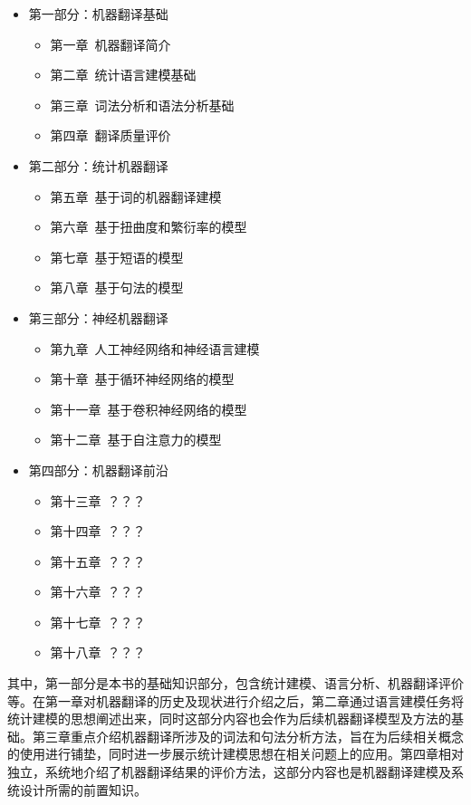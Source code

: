 \begin{spacing}{1.18}
\begin{itemize}
\vspace{0.5em}
\item 第一部分：机器翻译基础
    \begin{itemize}
    \item 第一章\ 机器翻译简介
    \item 第二章\ 统计语言建模基础
    \item 第三章\ 词法分析和语法分析基础
    \item 第四章\ 翻译质量评价
    \end{itemize}
\vspace{0.5em}
\item 第二部分：统计机器翻译
    \begin{itemize}
    \item 第五章\ 基于词的机器翻译建模
    \item 第六章\ 基于扭曲度和繁衍率的模型
    \item 第七章\ 基于短语的模型
    \item 第八章\ 基于句法的模型
    \end{itemize}
\vspace{0.5em}
\item 第三部分：神经机器翻译
    \begin{itemize}
    \item 第九章\ 人工神经网络和神经语言建模
    \item 第十章\ 基于循环神经网络的模型
    \item 第十一章\ 基于卷积神经网络的模型
    \item 第十二章\ 基于自注意力的模型
    \end{itemize}
\vspace{0.5em}
\item 第四部分：机器翻译前沿
    \begin{itemize}
    \item 第十三章\ ？？？
    \item 第十四章\ ？？？
    \item 第十五章\ ？？？
    \item 第十六章\ ？？？
    \item 第十七章\ ？？？
    \item 第十八章\ ？？？
    \end{itemize}
\end{itemize}

\vspace{0.5em}

其中，第一部分是本书的基础知识部分，包含统计建模、语言分析、机器翻译评价等。在第一章对机器翻译的历史及现状进行介绍之后，第二章通过语言建模任务将统计建模的思想阐述出来，同时这部分内容也会作为后续机器翻译模型及方法的基础。第三章重点介绍机器翻译所涉及的词法和句法分析方法，旨在为后续相关概念的使用进行铺垫，同时进一步展示统计建模思想在相关问题上的应用。第四章相对独立，系统地介绍了机器翻译结果的评价方法，这部分内容也是机器翻译建模及系统设计所需的前置知识。


\end{spacing}

